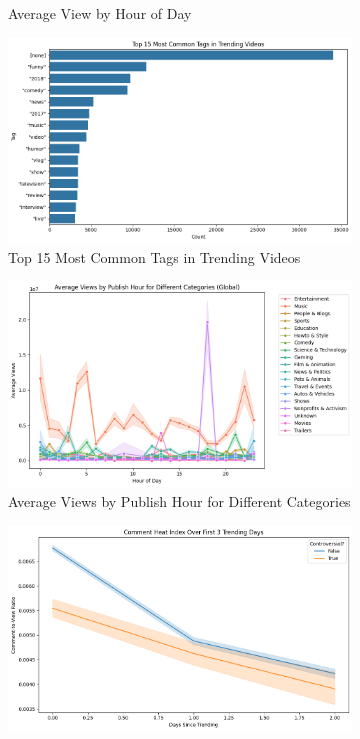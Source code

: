 \documentclass[a4paper]{article}
\begin{document}
\begin{figure}[h]
\begin{subfigure}{0.3\textwidth}
        \caption{Average View by Hour of Day}
        \label{fig:sub3}
    \end{subfigure}
    \hfill
    \begin{subfigure}{0.3\textwidth}
        \includegraphics[width=\linewidth]{other6.png}
        \caption{Top 15 Most Common Tags in Trending Videos}
        \label{fig:sub6}
    \end{subfigure}
    \hfill
    \begin{subfigure}{0.3\textwidth}
        \includegraphics[width=\linewidth]{other9.png}
        \caption{Average Views by Publish Hour for Different Categories}
        \label{fig:sub5}
    \end{subfigure}
    \hfill
    \begin{subfigure}{0.3\textwidth}
        \includegraphics[width=\linewidth]{other10.png}

\end{subfigure}
\end{figure}
\end{document}
